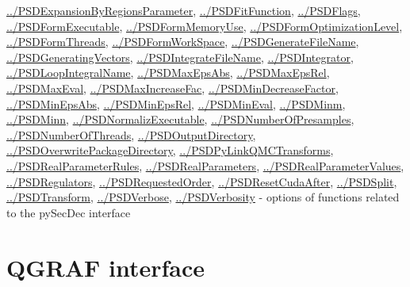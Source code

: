 \documentclass[../FeynHelpersManual.tex]{subfiles}
\begin{document}
\begin{itemize}
  \hyperlink{../psdexpansionbyregionsparameter}{../PSDExpansionByRegionsParameter},
  \hyperlink{../psdfitfunction}{../PSDFitFunction},
  \hyperlink{../psdflags}{../PSDFlags},
  \hyperlink{../psdformexecutable}{../PSDFormExecutable},
  \hyperlink{../psdformmemoryuse}{../PSDFormMemoryUse},
  \hyperlink{../psdformoptimizationlevel}{../PSDFormOptimizationLevel},
  \hyperlink{../psdformthreads}{../PSDFormThreads},
  \hyperlink{../psdformworkspace}{../PSDFormWorkSpace},
  \hyperlink{../psdgeneratefilename}{../PSDGenerateFileName},
  \hyperlink{../psdgeneratingvectors}{../PSDGeneratingVectors},
  \hyperlink{../psdintegratefilename}{../PSDIntegrateFileName},
  \hyperlink{../psdintegrator}{../PSDIntegrator},
  \hyperlink{../psdloopintegralname}{../PSDLoopIntegralName},
  \hyperlink{../psdmaxepsabs}{../PSDMaxEpsAbs},
  \hyperlink{../psdmaxepsrel}{../PSDMaxEpsRel},
  \hyperlink{../psdmaxeval}{../PSDMaxEval},
  \hyperlink{../psdmaxincreasefac}{../PSDMaxIncreaseFac},
  \hyperlink{../psdmindecreasefactor}{../PSDMinDecreaseFactor},
  \hyperlink{../psdminepsabs}{../PSDMinEpsAbs},
  \hyperlink{../psdminepsrel}{../PSDMinEpsRel},
  \hyperlink{../psdmineval}{../PSDMinEval},
  \hyperlink{../psdminm}{../PSDMinm},
  \hyperlink{../psdminn}{../PSDMinn},
  \hyperlink{../psdnormalizexecutable}{../PSDNormalizExecutable},
  \hyperlink{../psdnumberofpresamples}{../PSDNumberOfPresamples},
  \hyperlink{../psdnumberofthreads}{../PSDNumberOfThreads},
  \hyperlink{../psdoutputdirectory}{../PSDOutputDirectory},
  \hyperlink{../psdoverwritepackagedirectory}{../PSDOverwritePackageDirectory},
  \hyperlink{../psdpylinkqmctransforms}{../PSDPyLinkQMCTransforms},
  \hyperlink{../psdrealparameterrules}{../PSDRealParameterRules},
  \hyperlink{../psdrealparameters}{../PSDRealParameters},
  \hyperlink{../psdrealparametervalues}{../PSDRealParameterValues},
  \hyperlink{../psdregulators}{../PSDRegulators},
  \hyperlink{../psdrequestedorder}{../PSDRequestedOrder},
  \hyperlink{../psdresetcudaafter}{../PSDResetCudaAfter},
  \hyperlink{../psdsplit}{../PSDSplit},
  \hyperlink{../psdtransform}{../PSDTransform},
  \hyperlink{../psdverbose}{../PSDVerbose},
  \hyperlink{../psdverbosity}{../PSDVerbosity} - options of functions
  related to the pySecDec interface
\end{itemize}

\hypertarget{qgraf interface}{
\section{QGRAF interface}\label{qgraf interface}}
\end{document}
